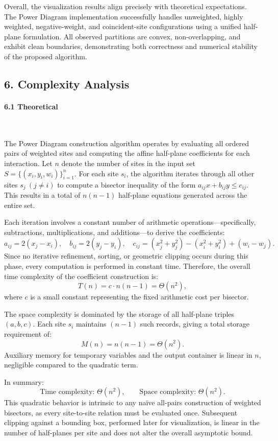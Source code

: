 \documentclass{article}
\begin{document}
Overall, the visualization results align precisely with theoretical expectations.  
The Power Diagram implementation successfully handles unweighted, highly weighted, negative-weight, and coincident-site configurations using a unified half-plane formulation.  
All observed partitions are convex, non-overlapping, and exhibit clean boundaries, demonstrating both correctness and numerical stability of the proposed algorithm.

\subsection*{6. Complexity Analysis}

\paragraph{6.1 Theoretical}\

The Power Diagram construction algorithm operates by evaluating all ordered pairs of weighted sites and computing the affine half-plane coefficients for each interaction.  
Let \(n\) denote the number of sites in the input set \(S=\{(x_i,y_i,w_i)\}_{i=1}^n\).  
For each site \(s_i\), the algorithm iterates through all other sites \(s_j\ (j\neq i)\) to compute a bisector inequality of the form \(a_{ij}x+b_{ij}y\le c_{ij}\).  
This results in a total of \(n(n-1)\) half-plane equations generated across the entire set.

Each iteration involves a constant number of arithmetic operations—specifically, subtractions, multiplications, and additions—to derive the coefficients:
\[
a_{ij}=2(x_j-x_i),\quad b_{ij}=2(y_j-y_i),\quad
c_{ij}=(x_j^2+y_j^2)-(x_i^2+y_i^2)+(w_i-w_j).
\]
Since no iterative refinement, sorting, or geometric clipping occurs during this phase, every computation is performed in constant time.  
Therefore, the overall time complexity of the coefficient construction is:
\[
T(n) = c \cdot n(n-1) = \Theta(n^2),
\]
where \(c\) is a small constant representing the fixed arithmetic cost per bisector.

The space complexity is dominated by the storage of all half-plane triples \((a,b,c)\).  
Each site \(s_i\) maintains \((n-1)\) such records, giving a total storage requirement of:
\[
M(n) = n(n-1) = \Theta(n^2).
\]
Auxiliary memory for temporary variables and the output container is linear in \(n\), negligible compared to the quadratic term.

In summary:
\[
\text{Time complexity: } \Theta(n^2), \qquad
\text{Space complexity: } \Theta(n^2).
\]
This quadratic behavior is intrinsic to any naïve all-pairs construction of weighted bisectors, as every site-to-site relation must be evaluated once.  
Subsequent clipping against a bounding box, performed later for visualization, is linear in the number of half-planes per site and does not alter the overall asymptotic bound.
\end{document}
